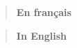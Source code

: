 \begin{abstract}
	\textbf{En français}
	\lipsum[1]
\end{abstract}

\begin{abstract}
	\textbf{In English}
	\lipsum[1]
\end{abstract}
